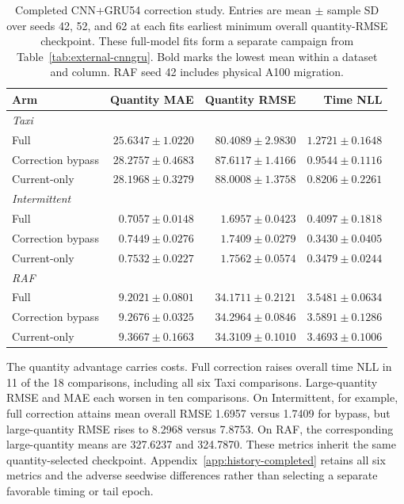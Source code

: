 \documentclass[runningheads]{llncs}
\begin{document}
\begin{table}[t]
\caption{Completed CNN+GRU54 correction study. Entries are mean $\pm$ sample SD over seeds 42, 52, and 62 at each fit\textquotesingle s earliest minimum overall quantity-RMSE checkpoint. These full-model fits form a separate campaign from Table~\ref{tab:external-cnngru}. Bold marks the lowest mean within a dataset and column. RAF seed 42 includes physical A100 migration.}
\label{tab:history-cnngru}
\centering\small
\setlength{\tabcolsep}{4pt}
\begin{tabular}{@{}lrrr@{}}
\toprule
Arm & Quantity MAE & Quantity RMSE & Time NLL\\
\midrule
\multicolumn{4}{l}{\textit{Taxi}}\\
Full & $\mathbf{25.6347\pm1.0220}$ & $\mathbf{80.4089\pm2.9830}$ & $1.2721\pm0.1648$\\
Correction bypass & $28.2757\pm0.4683$ & $87.6117\pm1.4166$ & $0.9544\pm0.1116$\\
Current-only & $28.1968\pm0.3279$ & $88.0008\pm1.3758$ & $\mathbf{0.8206\pm0.2261}$\\
\midrule
\multicolumn{4}{l}{\textit{Intermittent}}\\
Full & $\mathbf{0.7057\pm0.0148}$ & $\mathbf{1.6957\pm0.0423}$ & $0.4097\pm0.1818$\\
Correction bypass & $0.7449\pm0.0276$ & $1.7409\pm0.0279$ & $\mathbf{0.3430\pm0.0405}$\\
Current-only & $0.7532\pm0.0227$ & $1.7562\pm0.0574$ & $0.3479\pm0.0244$\\
\midrule
\multicolumn{4}{l}{\textit{RAF}}\\
Full & $\mathbf{9.2021\pm0.0801}$ & $\mathbf{34.1711\pm0.2121}$ & $3.5481\pm0.0634$\\
Correction bypass & $9.2676\pm0.0325$ & $34.2964\pm0.0846$ & $3.5891\pm0.1286$\\
Current-only & $9.3667\pm0.1663$ & $34.3109\pm0.1010$ & $\mathbf{3.4693\pm0.1006}$\\
\bottomrule
\end{tabular}
\end{table}

The quantity advantage carries costs. Full correction raises overall time NLL in 11 of the 18 comparisons, including all six Taxi comparisons. Large-quantity RMSE and MAE each worsen in ten comparisons. On Intermittent, for example, full correction attains mean overall RMSE 1.6957 versus 1.7409 for bypass, but large-quantity RMSE rises to 8.2968 versus 7.8753. On RAF, the corresponding large-quantity means are 327.6237 and 324.7870. These metrics inherit the same quantity-selected checkpoint. Appendix~\ref{app:history-completed} retains all six metrics and the adverse seedwise differences rather than selecting a separate favorable timing or tail epoch.
\end{document}

